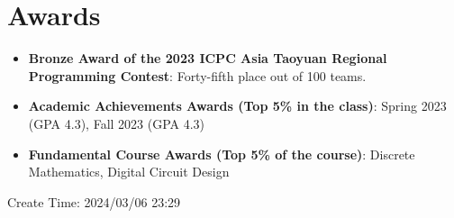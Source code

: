 \documentclass[a4paper,22pt]{article}
\begin{document}


\section{Awards}
\begin{itemize}[leftmargin=*]
\item {\textbf{Bronze Award of the 2023 ICPC Asia Taoyuan Regional Programming Contest}: Forty-fifth place out of 100 teams.}
\item {\textbf{Academic Achievements Awards (Top 5\% in the class)}: Spring 2023 (GPA 4.3), Fall 2023 (GPA 4.3)}
\item {\textbf{Fundamental Course Awards (Top 5\% of the course)}: Discrete Mathematics, Digital Circuit Design}
\end{itemize}



\vspace{10pt}
Create Time: 2024/03/06 23:29
\end{document}
